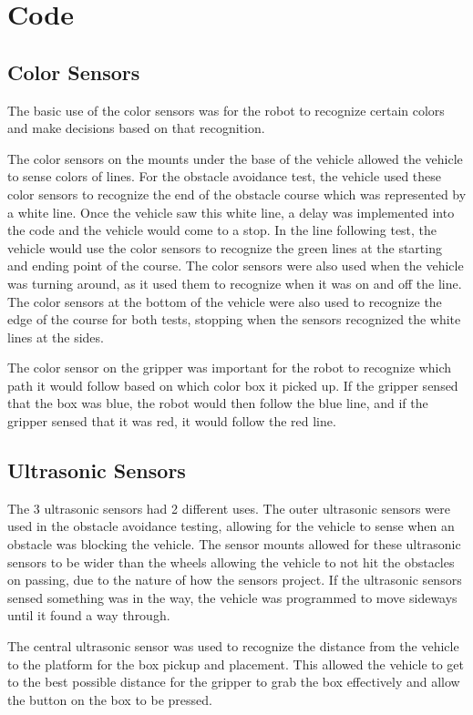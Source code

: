 \documentclass[11pt]{report}
\begin{document}
\section{Code}
\subsection{Color Sensors}
The basic use of the color sensors was for the robot to recognize certain colors and make decisions based on that recognition. 

\par The color sensors on the mounts under the base of the vehicle allowed the vehicle to sense colors of lines. For the obstacle avoidance test, the vehicle used these color sensors to recognize the end of the obstacle course which was represented by a white line. Once the vehicle saw this white line, a delay was implemented into the code and the vehicle would come to a stop. In the line following test, the vehicle would use the color sensors to recognize the green lines at the starting and ending point of the course. The color sensors were also used when the vehicle was turning around, as it used them to recognize when it was on and off the line. The color sensors at the bottom of the vehicle were also used to recognize the edge of the course for both tests, stopping when the sensors recognized the white lines at the sides.

\par The color sensor on the gripper was important for the robot to recognize which path it would follow based on which color box it picked up. If the gripper sensed that the box was blue, the robot would then follow the blue line, and if the gripper sensed that it was red, it would follow the red line. 

\subsection{Ultrasonic Sensors}
The 3 ultrasonic sensors had 2 different uses. The outer ultrasonic sensors were used in the obstacle avoidance testing, allowing for the vehicle to sense when an obstacle was blocking the vehicle. The sensor mounts allowed for these ultrasonic sensors to be wider than the wheels allowing the vehicle to not hit the obstacles on passing, due to the nature of how the sensors project. If the ultrasonic sensors sensed something was in the way, the vehicle was programmed to move sideways until it found a way through. 

\par The central ultrasonic sensor was used to recognize the distance from the vehicle to the platform for the box pickup and placement. This allowed the vehicle to get to the best possible distance for the gripper to grab the box effectively and allow the button on the box to be pressed. 
\end{document}
